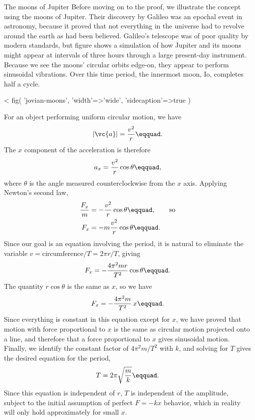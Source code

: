 \begin{eg}{The moons of Jupiter}\label{eg:jovian-moons}
Before moving on to the proof, we illustrate the concept
using the moons
of Jupiter. Their discovery by Galileo was an epochal event
in astronomy, because it proved that not everything in the
universe had to revolve around the earth as had been
believed. Galileo's telescope was of poor quality by modern
standards, but figure  shows a simulation of how
Jupiter and its moons might appear at intervals of three
hours through a large present-day instrument. Because we see
the moons' circular orbits edge-on, they appear to perform
sinusoidal vibrations. Over this time period, the innermost
moon, Io, completes half a cycle.
\end{eg}

<%
  fig(
    'jovian-moons',
    {
      'width'=>'wide',
      'sidecaption'=>true
    }
  )


For an object performing uniform circular motion, we have
\begin{equation*}
                |\vc{a}|         =    \frac{v^2}{r}\eqquad.
\end{equation*}
The $x$ component of the acceleration is therefore
\begin{equation*}
                        a_x         =    \frac{v^2}{r}\cos\theta\eqquad,
\end{equation*}
where $\theta $ is the angle measured counterclockwise from
the $x$ axis. Applying Newton's second law,
\begin{align*}
 \frac{F_x}{m} &= -\frac{v^2}{r}\cos\theta\eqquad, \qquad \text{so} \\
 F_x &= -m\frac{v^2}{r}\cos\theta\eqquad.
\end{align*}
Since our goal is an equation involving the period, it is
natural to eliminate the variable $v = \text{circumference}/T=2\pi r/T$, giving
\begin{equation*}
                        F_x         =    -\frac{4\pi^2 mr}{T^2}\cos\theta\eqquad.
\end{equation*}
The quantity $r \cos \theta $ is the same as $x$, so we have
\begin{equation*}
                        F_x         =    -\frac{4\pi^2 m}{T^2}\: x\eqquad.
\end{equation*}
Since everything is constant in this equation except for
$x$, we have proved that motion with force proportional to
$x$ is the same as circular motion projected onto a line,
and therefore that a force proportional to $x$ gives
sinusoidal motion. Finally, we identify the constant factor
of $4\pi^2m/T^2$ with $k$, and solving for $T$ gives the desired
equation for the period,
\begin{equation*}
                        T         =     2\pi\sqrt{\frac{m}{k}}\eqquad.
\end{equation*}
Since this equation is independent of $r$, $T$ is independent of the amplitude,
subject to the initial assumption of perfect $F=-kx$ behavior, which in reality
will only hold approximately for small $x$.

